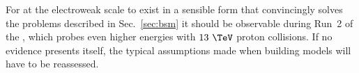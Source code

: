 
For \SUSY at the electroweak scale to exist in a sensible form that
convincingly solves the problems described in Sec.~\ref{sec:bsm} it
should be observable during Run~2 of the \LHC, which probes even higher
energies with $13~\tev$ proton collisions. If no evidence presents
itself, the typical assumptions made when building \SUSY models will
have to be reassessed.

